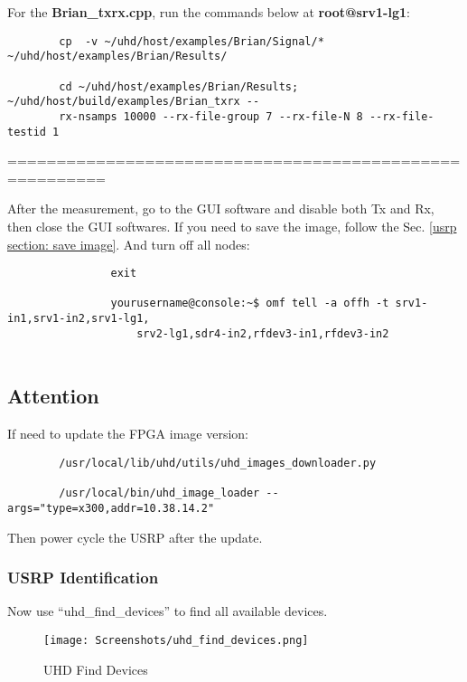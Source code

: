 \documentclass{article}
\begin{document}
        
        
        For the \textbf{Brian\_txrx.cpp}, run the commands below at \textbf{root@srv1-lg1}:
        \begin{verbatim}
        cp  -v ~/uhd/host/examples/Brian/Signal/* ~/uhd/host/examples/Brian/Results/

        cd ~/uhd/host/examples/Brian/Results; ~/uhd/host/build/examples/Brian_txrx --
        rx-nsamps 10000 --rx-file-group 7 --rx-file-N 8 --rx-file-testid 1
        \end{verbatim}
        
        
        ========================================================
        
        After the measurement, go to the GUI software and disable both Tx and Rx, then close the GUI softwares. If you need to save the image, follow the Sec. \ref{usrp section: save image}. And turn off all nodes:
        \begin{verbatim}
                exit
                
                yourusername@console:~$ omf tell -a offh -t srv1-in1,srv1-in2,srv1-lg1,
                    srv2-lg1,sdr4-in2,rfdev3-in1,rfdev3-in2
                     
            \end{verbatim}
        
    \subsection{Attention}
        
        If need to update the FPGA image version:
        \begin{verbatim}
        /usr/local/lib/uhd/utils/uhd_images_downloader.py
        
        /usr/local/bin/uhd_image_loader --args="type=x300,addr=10.38.14.2"
        \end{verbatim}
        
        Then power cycle the USRP after the update. 
        
        

        
        
        
        \subsubsection{USRP Identification}
        Now use ``uhd\_find\_devices'' to find all available devices. 
        \begin{figure}[ht]
            \centering
            \texttt{[image: Screenshots/uhd\_find\_devices.png]}
            \caption{UHD Find Devices}
            \vspace*{0mm}
            \label{fig: uhd find devices}
        \end{figure}
        
\end{document}
